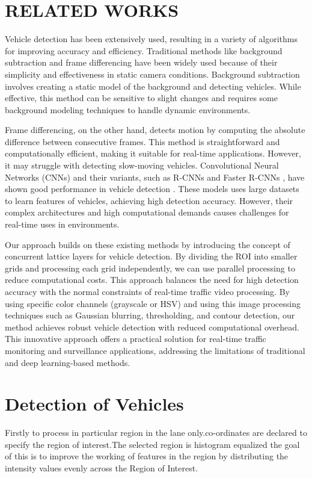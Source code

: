 \documentclass[conference]{IEEEtran}
\begin{document}
\section{RELATED WORKS}
Vehicle detection has been extensively used, resulting in a variety of algorithms for improving accuracy and efficiency. Traditional methods like background subtraction and frame differencing  \cite{b4} have been widely used because of their simplicity and effectiveness in static camera conditions. Background subtraction  \cite{b4} involves creating a static model of the background and detecting vehicles. While effective, this method can be sensitive to slight changes and requires some background modeling techniques to handle dynamic environments.

Frame differencing, on the other hand, detects motion by computing the absolute difference between consecutive frames. This method is straightforward and computationally efficient, making it suitable for real-time applications. However, it may struggle with detecting slow-moving vehicles. Convolutional Neural Networks (CNNs) and their variants, such as R-CNNs and Faster R-CNNs \cite{b2}, have shown good performance in vehicle detection . These models uses large  datasets to learn features of vehicles, achieving high detection accuracy. However, their complex architectures and high computational demands causes challenges for real-time uses in environments.

Our approach builds on these existing methods by introducing the concept of concurrent lattice layers for vehicle detection. By dividing the ROI into smaller grids and processing each grid independently, we can use parallel processing to reduce computational costs. This approach balances the need for high detection accuracy with the normal constraints of real-time traffic video processing. By using specific color channels (grayscale or HSV) and using this image processing techniques such as Gaussian blurring, thresholding, and contour detection, our method achieves robust vehicle detection with reduced computational overhead. This innovative approach offers a practical solution for real-time traffic monitoring and surveillance applications, addressing the limitations of traditional and deep learning-based methods.

\section{Detection of Vehicles}

Firstly to process in particular region in the lane only.co-ordinates are declared to specify the region of interest.The selected region is histogram equalized the goal of this is to improve the working of features in the region by distributing the intensity values evenly across the Region of Interest.
\end{document}
